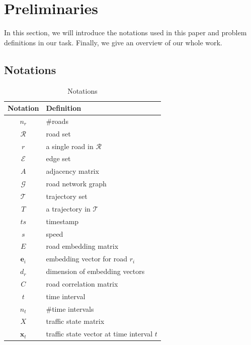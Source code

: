 
\section{Preliminaries}
In this section, we will introduce the notations used in this paper and problem definitions in our task. Finally, we give an overview of our whole work.

\subsection{Notations}
\begin{table}[htb]
    \begin{center}
        \caption{Notations}
        \label{notation_table}
        \begin{tabular}{cl}
            \toprule

            \textbf{Notation} & \textbf{Definition}                       \\

            \midrule

            $n_r$             & \#roads                                   \\
            $\mathcal R$      & road set                                  \\
            $r$               & a single road in $\mathcal R$             \\
            $\mathcal E$      & edge set                                  \\
            $A$               & adjacency matrix                          \\
            $\mathcal G$      & road network graph                        \\
            $\mathcal T$      & trajectory set                            \\
            $T$               & a trajectory in $\mathcal T$              \\
            $ts$              & timestamp                                 \\
            $s$               & speed                                     \\
            $E$               & road embedding matrix                     \\
            $\mathbf{e}_i$    & embedding vector for road $r_i$           \\
            $d_r$             & dimension of embedding vectors            \\
            $C$               & road correlation matrix                   \\
            $t$               & time interval                             \\
            $n_t$             & \#time intervals                          \\
            $X$               & traffic state matrix                      \\
            $\mathbf x_t$     & traffic state vector at time interval $t$ \\


\end{tabular}
\end{center}
\end{table}
